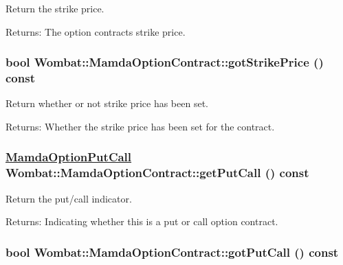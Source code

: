 Return the strike price. 

\begin{Desc}
\item[Returns:]The option contracts strike price. \end{Desc}
\hypertarget{classWombat_1_1MamdaOptionContract_798b5f3f11b9578349a6503b22e3c171}{
\subsubsection[gotStrikePrice]{\setlength{\rightskip}{0pt plus 5cm}bool Wombat::Mamda\-Option\-Contract::got\-Strike\-Price () const}}
\label{classWombat_1_1MamdaOptionContract_798b5f3f11b9578349a6503b22e3c171}


Return whether or not strike price has been set. 

\begin{Desc}
\item[Returns:]Whether the strike price has been set for the contract. \end{Desc}
\hypertarget{classWombat_1_1MamdaOptionContract_2cc67d660671ab468738e118cc3640ce}{
\subsubsection[getPutCall]{\setlength{\rightskip}{0pt plus 5cm}\hyperlink{namespaceWombat_ceb2ef77ec6c36b48ef57d2887d6ac49}{Mamda\-Option\-Put\-Call} Wombat::Mamda\-Option\-Contract::get\-Put\-Call () const}}
\label{classWombat_1_1MamdaOptionContract_2cc67d660671ab468738e118cc3640ce}


Return the put/call indicator. 

\begin{Desc}
\item[Returns:]Indicating whether this is a put or call option contract. \end{Desc}
\hypertarget{classWombat_1_1MamdaOptionContract_b4dc254911cac44a174f4a010dba3507}{
\subsubsection[gotPutCall]{\setlength{\rightskip}{0pt plus 5cm}bool Wombat::Mamda\-Option\-Contract::got\-Put\-Call () const}}
\label{classWombat_1_1MamdaOptionContract_b4dc254911cac44a174f4a010dba3507}


